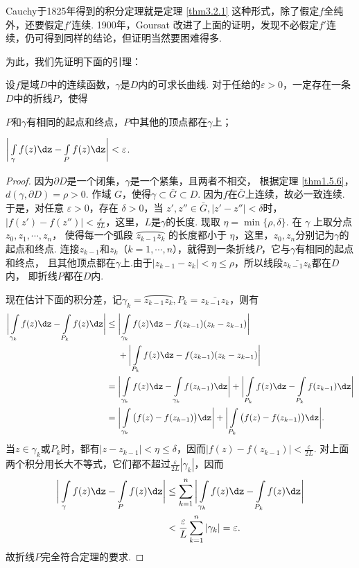 Cauchy于1825年得到的积分定理就是定理 \ref{thm3.2.1} 这种形式，除了假定$f$全纯外，还要假定$f'$连续.
1900年，Goursat 改进了上面的证明，发现不必假定$f'$连续，仍可得到同样的结论，但证明当然要困难得多.

为此，我们先证明下面的引理：
\begin{lemma}\label{lemma3.2.2}
  设$f$是域$D$中的连续函数，$\gamma$是$D$内的可求长曲线.
  对于任给的$\varepsilon>0$，一定存在一条$D$中的折线$P$，使得
  \begin{eenum}
    \item $P$和$\gamma$有相同的起点和终点，$P$中其他的顶点都在$\gamma$上；
    \item $\bigg|\int\limits_\gamma f(z)\dz-\int\limits_Pf(z)\dz\bigg|<\varepsilon$.
  \end{eenum}
\end{lemma}
\begin{proof}
因为$\partial D$是一个闭集，$\gamma$是一个紧集，且两者不相交，
根据定理 \ref{thm1.5.6}，$d(\gamma,\partial D)=\rho>0$.
作域 $G$，使得$\gamma\subset\bar G\subset D$. 因为$f$在$\bar G$上连续，故必一致连续.
于是，对任意 $\varepsilon>0$，存在 $\delta>0$，当 $z',z''\in\bar G,|z'-z''|<\delta$时，
$|f(z')-f(z'')|<\frac{\varepsilon}{2L}$，这里，$L$是$\gamma$的长度.
现取 $\eta=\min\{\rho,\delta\}$. 在 $\gamma$ 上取分点 $z_0,z_1,\cdots,z_n$，
使得每一个弧段 $\wideparen{z_{k-1}z_k}$ 的长度都小于 $\eta$，这里，$z_0,z_n$分别记为$\gamma$的起点和终点.
连接$z_{k-1}$和$z_k$（$k=1,\cdots,n$），就得到一条折线$P$，它与$\gamma$有相同的起点和终点，
且其他顶点都在$\gamma$上.由于$|z_{k-1}-z_k|<\eta\le\rho$，所以线段$\bar{z_{k-1}z_k}$都在$D$内，
即折线$P$都在$D$内.

现在估计下面的积分差，记$\gamma_k=\wideparen{z_{k-1}z_k},P_k=\bar{z_{k-1}z_k}$，则有
\begin{align*}
  \bigg|\int\limits_{\gamma_k} f(z)\dz-\int\limits_{P_k}f(z)\dz\bigg|\le{}
      & \bigg|\int\limits_{\gamma_k} f(z)\dz-f(z_{k-1})(z_k-z_{k-1})\bigg| \\
      & + \bigg|\int\limits_{P_k} f(z)\dz-f(z_{k-1})(z_k-z_{k-1})\bigg| \\
  ={} & \bigg|\int\limits_{\gamma_k} f(z)\dz-\int\limits_{\gamma_k} f(z_{k-1})\dz\bigg|
        + \bigg|\int\limits_{P_k} f(z)\dz-\int\limits_{P_k} f(z_{k-1})\dz\bigg| \\
  ={} & \bigg|\int\limits_{\gamma_k}\big(f(z)-f(z_{k-1})\big)\dz\bigg|
        + \bigg|\int\limits_{P_k}\big(f(z)-f(z_{k-1})\big)\dz\bigg|.
\end{align*}
当$z\in\gamma_k$或$P_k$时，都有$|z-z_{k-1}|<\eta\le\delta$，因而$|f(z)-f(z_{k-1})|
<\frac{\varepsilon}{2L}$. 对上面两个积分用长大不等式，它们都不超过$\frac{\varepsilon}{2L}|\gamma_k|$，因而
\begin{align*}
\bigg|\int\limits_\gamma f(z)\dz-\int\limits_Pf(z)\dz\bigg|&\le
\sum_{k=1}^n\bigg|\int\limits_{\gamma_k} f(z)\dz-\int\limits_{P_k}f(z)\dz\bigg|\\
&<\frac{\varepsilon}{L}\sum_{k=1}^n|\gamma_k|=\varepsilon.
\end{align*}
故折线$P$完全符合定理的要求.
\end{proof}

